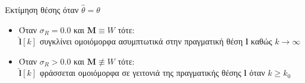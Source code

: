 \begin{frame}{Εκτίμηση θέσης όταν $\hat{\theta} = \theta$}

  \vspace{1cm}


  \begin{itemize}
    \item Όταν $\sigma_R = 0.0$ και $\bm{M}\equiv W$ τότε: \\
          $\hat{\bm{l}}[k]$ συγκλίνει ομοιόμορφα ασυμπτωτικά στην πραγματική θέση $\bm{l}$ καθώς $k \rightarrow \infty$ \vspace{0.25cm}
    \item Όταν $\sigma_R > 0.0$ και $\bm{M} \not\equiv W$ τότε: \\
          $\hat{\bm{l}}[k]$ φράσσεται ομοιόμορφα σε γειτονιά της πραγματικής θέσης $\bm{l}$ όταν $k \geq k_0$
  \end{itemize}


\end{frame}
